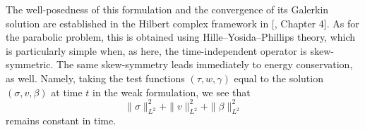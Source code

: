 {The well-posedness of this formulation and the convergence of its Galerkin solution are established in the Hilbert complex framework in [, Chapter 4]. As for the parabolic problem, this is obtained using Hille–Yosida–Phillips theory, which is particularly simple when, as here, the time-independent operator is skew-symmetric. The same skew-symmetry leads immediately to energy conservation, as well. Namely, taking the test functions $(\tau,w,\gamma)$ equal to the solution $(\sigma,v,\beta)$ at time $t$ in the weak formulation, we see that}
\[
\|\sigma\|_{L^2}^2+\|v\|_{L^2}^2+\|\beta\|_{L^2}^2
\]
{remains constant in time.}
